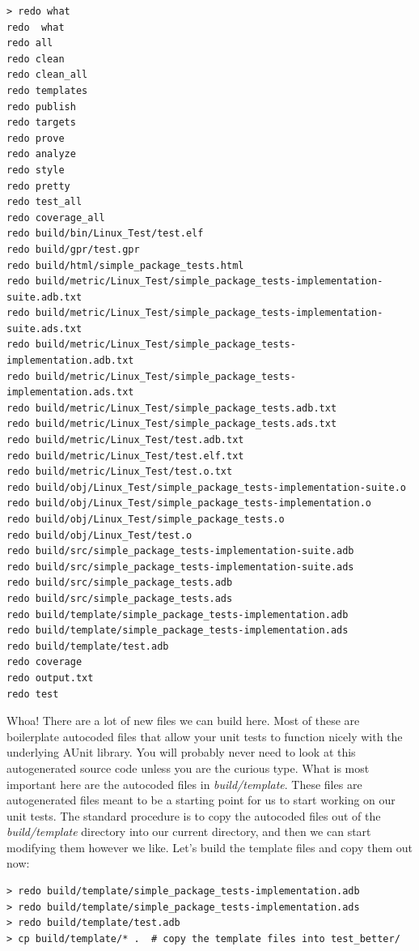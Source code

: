 \vspace{5mm} %
\begin{verbatim}
> redo what
redo  what
redo all
redo clean
redo clean_all
redo templates
redo publish
redo targets
redo prove
redo analyze
redo style
redo pretty
redo test_all
redo coverage_all
redo build/bin/Linux_Test/test.elf
redo build/gpr/test.gpr
redo build/html/simple_package_tests.html
redo build/metric/Linux_Test/simple_package_tests-implementation-suite.adb.txt
redo build/metric/Linux_Test/simple_package_tests-implementation-suite.ads.txt
redo build/metric/Linux_Test/simple_package_tests-implementation.adb.txt
redo build/metric/Linux_Test/simple_package_tests-implementation.ads.txt
redo build/metric/Linux_Test/simple_package_tests.adb.txt
redo build/metric/Linux_Test/simple_package_tests.ads.txt
redo build/metric/Linux_Test/test.adb.txt
redo build/metric/Linux_Test/test.elf.txt
redo build/metric/Linux_Test/test.o.txt
redo build/obj/Linux_Test/simple_package_tests-implementation-suite.o
redo build/obj/Linux_Test/simple_package_tests-implementation.o
redo build/obj/Linux_Test/simple_package_tests.o
redo build/obj/Linux_Test/test.o
redo build/src/simple_package_tests-implementation-suite.adb
redo build/src/simple_package_tests-implementation-suite.ads
redo build/src/simple_package_tests.adb
redo build/src/simple_package_tests.ads
redo build/template/simple_package_tests-implementation.adb
redo build/template/simple_package_tests-implementation.ads
redo build/template/test.adb
redo coverage
redo output.txt
redo test
\end{verbatim}
\vspace{5mm} %

Whoa! There are a lot of new files we can build here. Most of these are boilerplate autocoded files that allow your unit tests to function nicely with the underlying AUnit library. You will probably never need to look at this autogenerated source code unless you are the curious type. What is most important here are the autocoded files in \textit{build/template}. These files are autogenerated files meant to be a starting point for us to start working on our unit tests. The standard procedure is to copy the autocoded files out of the \textit{build/template} directory into our current directory, and then we can start modifying them however we like. Let's build the template files and copy them out now:

\vspace{5mm} %
\begin{verbatim}
> redo build/template/simple_package_tests-implementation.adb
> redo build/template/simple_package_tests-implementation.ads
> redo build/template/test.adb
> cp build/template/* .  # copy the template files into test_better/
\end{verbatim}
\vspace{5mm} %

